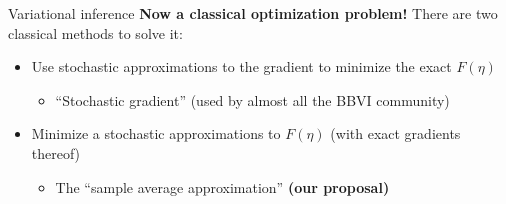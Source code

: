 \documentclass[8pt]{beamer}\usepackage[]{graphicx}\usepackage[]{color}
\begin{document}
\begin{frame}[t]{Variational inference \citep{blei:2016:variational}}
\textbf{Now a classical optimization problem!}  \pause There are two classical
methods to solve it:
%
\begin{itemize}
    \item Use stochastic approximations to the gradient to minimize the exact
        $F(\eta)$
    \begin{itemize}
        \item ``Stochastic gradient'' (used by almost all the BBVI community)
    \end{itemize}
    \pause
    \item Minimize a stochastic approximations to $F(\eta)$ (with
        exact gradients thereof)
    \begin{itemize}
        \item The ``sample average approximation'' \textbf{(our proposal)}
    \end{itemize}
\end{itemize}
%


%

\end{frame}



    




\end{document}
